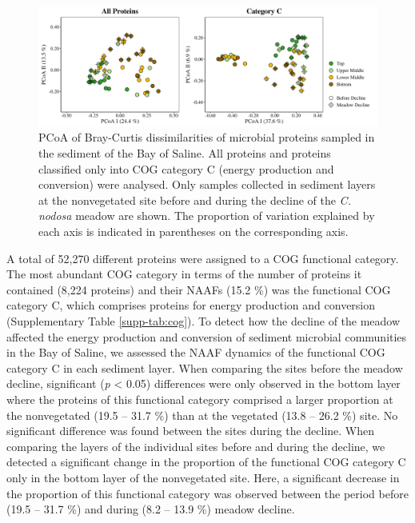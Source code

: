 \documentclass[
  12 pt,
]{article}
\begin{document}
\begin{figure}[H]

{\centering \includegraphics[width=1\linewidth]{../results/figures/pcoa_nonvegetated} 

}

\caption{PCoA of Bray-Curtis dissimilarities of microbial proteins sampled in the sediment of the Bay of Saline. All proteins and proteins classified only into COG category C (energy production and conversion) were analysed. Only samples collected in sediment layers at the nonvegetated site before and during the decline of the \emph{C. nodosa} meadow are shown. The proportion of variation explained by each axis is indicated in parentheses on the corresponding axis.}\label{fig:pcoa-nonvegetated}
\end{figure}

A total of 52,270 different proteins were assigned to a COG functional category. The most abundant COG category in terms of the number of proteins it contained (8,224 proteins) and their NAAFs (15.2 \si{\percent}) was the functional COG category C, which comprises proteins for energy production and conversion (Supplementary Table \ref{supp-tab:cog}). To detect how the decline of the meadow affected the energy production and conversion of sediment microbial communities in the Bay of Saline, we assessed the NAAF dynamics of the functional COG category C in each sediment layer. When comparing the sites before the meadow decline, significant (\emph{p} \textless{} 0.05) differences were only observed in the bottom layer where the proteins of this functional category comprised a larger proportion at the nonvegetated (19.5 -- 31.7 \si{\percent}) than at the vegetated (13.8 -- 26.2 \si{\percent}) site. No significant difference was found between the sites during the decline. When comparing the layers of the individual sites before and during the decline, we detected a significant change in the proportion of the functional COG category C only in the bottom layer of the nonvegetated site. Here, a significant decrease in the proportion of this functional category was observed between the period before (19.5 -- 31.7 \si{\percent}) and during (8.2 -- 13.9 \si{\percent}) meadow decline.
\end{document}
